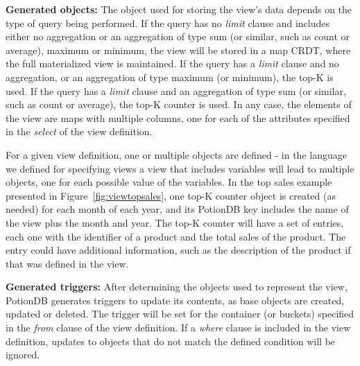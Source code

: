 \documentclass[sigplan,twocolumn,review,anonymous]{acmart}
\begin{document}
\noindent
\textbf{Generated objects:}
The object used for storing the view's data depends on the type of query being performed. 
If the query has no  \emph{limit} clause and includes either no aggregation or an aggregation of type sum (or similar, such as count or average), maximum or minimum, the view will be stored in a map CRDT, where the full materialized view is maintained. 
If the query has a  \emph{limit} clause and no aggregation, or an aggregation of type maximum (or minimum), the top-K is used.
If the query has a \emph{limit} clause and an aggregation of type sum (or similar, such as count or average), the top-K counter is used.
In any case, the elements of the view are maps with multiple columns, one for each
of the attributes specified in the  \emph{select} of the view definition.  

For a given view definition, one or multiple objects are defined - in the language we defined for 
specifying views  a view that includes variables will lead to multiple objects,
one for each possible value of the variables. 
In the top sales example presented in Figure~\ref{fig:viewtopsales}, one top-K counter
object is created (as needed) for each month of each year, and its PotionDB key includes
the name of the view plus the month and year.  The top-K counter will have a set
of entries, each one with the identifier of a product and the total sales of the product. The entry
could have additional information, such as the description of the product if that was defined
in the view.

\noindent
\textbf{Generated triggers:}
After determining the objects used to represent the view, PotionDB generates triggers to update 
its contents,
as base objects are created, updated or deleted.
The trigger will be set for the container (or buckets) specified in the \emph{from} clause of the view
definition.
If a \emph{where} clause is included in the view definition, updates to objects that do not match the 
defined condition will be ignored.
\end{document}
